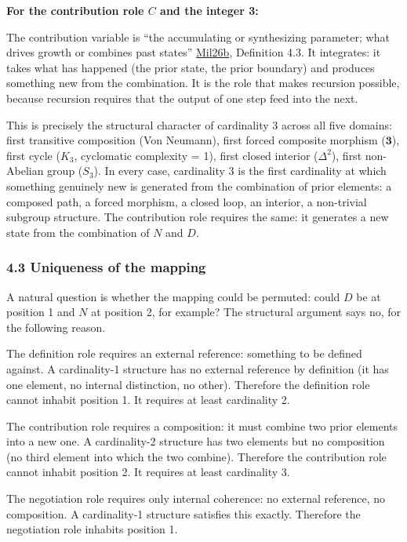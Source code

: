 \documentclass[
  11pt,
  letterpaper,
]{article}
\begin{document}
\textbf{For the contribution role \(C\) and the integer 3:}

The contribution variable is ``the accumulating or synthesizing
parameter; what drives growth or combines past states''
\href{https://github.com/baardev/truevalue/blob/main/docnav/Research/papers/3_minimal-recursive-triadic-framework/3_minimal-recursive-triadic-framework.pdf}{Mil26b},
Definition 4.3. It integrates: it takes what has happened (the prior
state, the prior boundary) and produces something new from the
combination. It is the role that makes recursion possible, because
recursion requires that the output of one step feed into the next.

This is precisely the structural character of cardinality 3 across all
five domains: first transitive composition (Von Neumann), first forced
composite morphism (\(\mathbf{3}\)), first cycle (\(K_3\), cyclomatic
complexity = 1), first closed interior (\(\Delta^2\)), first non-Abelian
group (\(S_3\)). In every case, cardinality 3 is the first cardinality
at which something genuinely new is generated from the combination of
prior elements: a composed path, a forced morphism, a closed loop, an
interior, a non-trivial subgroup structure. The contribution role
requires the same: it generates a new state from the combination of
\(N\) and \(D\).

\subsubsection{4.3 Uniqueness of the
mapping}\label{uniqueness-of-the-mapping}

A natural question is whether the mapping could be permuted: could \(D\)
be at position 1 and \(N\) at position 2, for example? The structural
argument says no, for the following reason.

The definition role requires an external reference: something to be
defined against. A cardinality-1 structure has no external reference by
definition (it has one element, no internal distinction, no other).
Therefore the definition role cannot inhabit position 1. It requires at
least cardinality 2.

The contribution role requires a composition: it must combine two prior
elements into a new one. A cardinality-2 structure has two elements but
no composition (no third element into which the two combine). Therefore
the contribution role cannot inhabit position 2. It requires at least
cardinality 3.

The negotiation role requires only internal coherence: no external
reference, no composition. A cardinality-1 structure satisfies this
exactly. Therefore the negotiation role inhabits position 1.
\end{document}

